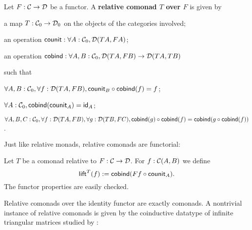 \documentclass{amsart}
\newcommand{\fat}[1]{\textbf{#1}}
\begin{document}
\begin{definition}\label{def:rel_comonad}
  Let $F:\C\to\D$ be a functor. A \fat{relative comonad $T$ over $F$} is given by
  \begin{packitem}
   \item a map $T:\C_0 \to \D_0$ on the objects of the categories involved;
   \item an operation $\counit : \forall A : \C_0, \D(TA,FA)$;
   \item an operation $\cobind: \forall A,B:\C_0, \D(TA,FB) \to \D(TA,TB)$
  \end{packitem}
  such that 
  \begin{packitem}
   \item $\forall A,B:\C_0, \forall f:\D(TA,FB), \comp{\cobind(f)}{\counit_B} = f$;
   \item $\forall A : \C_0, \cobind(\counit_A) = \id_A$;
   \item $\forall A,B,C:\C_0, \forall f : \D(TA,FB),\forall g:\D(TB,FC), \\
        \comp{\cobind(f)}{\cobind(g)} = \cobind(\comp{\cobind(f)}{g})$.
  \end{packitem} 
\end{definition}
Just like relative monads, relative comonads are functorial:
\begin{definition}\label{def:lift}
 Let $T$ be a  comonad relative to $F:\C\to\D$.
 For $f : \C(A,B)$ we define
  \[ \lift^T(f) := \cobind(\comp{\counit_A}{Ff}) .  \]
 The functor properties are easily checked.
\end{definition}
Relative comonads over the identity functor are exactly comonads.
A nontrivial instance of relative comonads is given by the coinductive datatype of infinite triangular matrices
studied by \textcite{DBLP:conf/types/MatthesP11}:
\end{document}
